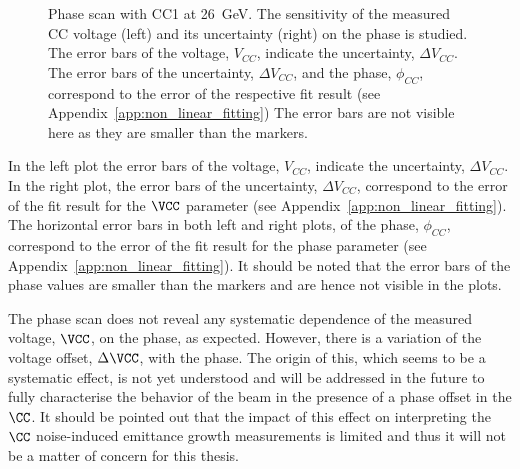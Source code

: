 \begin{figure}[!ht]
\begin{subfigure}[t]{0.45\textwidth}
   \end{subfigure}
   \hfill
    \caption{Phase scan with CC1 at 26\, GeV. The sensitivity of the measured CC voltage (left) and its uncertainty (right) on the phase is studied. The error bars of the voltage, $V_{CC}$, indicate the uncertainty, $\Delta V_{CC}$. The error bars of the uncertainty, $\Delta V_{CC}$, and the phase, $\phi_{CC}$, correspond to the error of the respective fit result (see Appendix~\ref{app:non_linear_fitting}) The error bars are not visible here as they are smaller than the markers.
    }
    \label{fig:phase_scan_CC1}
\end{figure}

In the left plot the error bars of the voltage, $V_{CC}$, indicate the uncertainty, $\Delta V_{CC}$. In the right plot, the error bars of the uncertainty, $\Delta V_{CC}$, correspond to the error of the fit result for the $\VCC$ parameter  (see Appendix~\ref{app:non_linear_fitting}). The horizontal error bars in both left and right plots, of the phase, $\phi_{CC}$, correspond to the error of the fit result for the phase parameter (see Appendix~\ref{app:non_linear_fitting}). It should be noted that the error bars of the 
phase values are smaller than the markers and are hence not visible in the plots. 

The phase scan does not reveal any systematic dependence of the measured voltage, $\VCC$, on the phase, as expected. However, there is a variation of the voltage offset, $\Delta \VCC$, with the phase. The origin of this, which seems to be a systematic effect, is not yet understood and will be addressed in the future to fully characterise the behavior of the beam in the presence of a phase offset in the $\CC$. It should be pointed out that the impact of this effect on interpreting the $\CC$ noise-induced emittance growth measurements is limited and thus it will not be a matter of concern for this thesis. 

